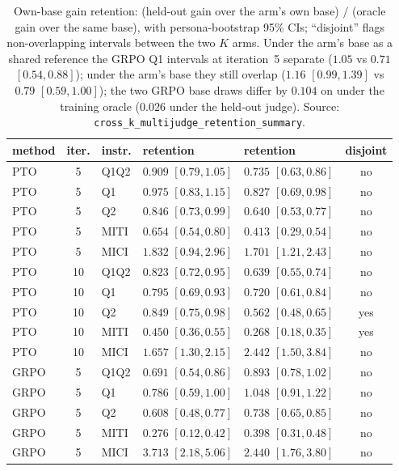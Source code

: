 \begin{table}[t]
  \centering\scriptsize
  \setlength{\tabcolsep}{2pt}
  \begin{tabular}{@{}l c l ll c@{}}
    \toprule
    method & iter. & instr. & \Kz{} retention & \Kf{} retention & disjoint \\
    \midrule
PTO & 5 & Q1Q2 & $0.909$ $[0.79, 1.05]$ & $0.735$ $[0.63, 0.86]$ & no \\
PTO & 5 & Q1 & $0.975$ $[0.83, 1.15]$ & $0.827$ $[0.69, 0.98]$ & no \\
PTO & 5 & Q2 & $0.846$ $[0.73, 0.99]$ & $0.640$ $[0.53, 0.77]$ & no \\
PTO & 5 & MITI & $0.654$ $[0.54, 0.80]$ & $0.413$ $[0.29, 0.54]$ & no \\
PTO & 5 & MICI & $1.832$ $[0.94, 2.96]$ & $1.701$ $[1.21, 2.43]$ & no \\
\addlinespace[2pt]
PTO & 10 & Q1Q2 & $0.823$ $[0.72, 0.95]$ & $0.639$ $[0.55, 0.74]$ & no \\
PTO & 10 & Q1 & $0.795$ $[0.69, 0.93]$ & $0.720$ $[0.61, 0.84]$ & no \\
PTO & 10 & Q2 & $0.849$ $[0.75, 0.98]$ & $0.562$ $[0.48, 0.65]$ & yes \\
PTO & 10 & MITI & $0.450$ $[0.36, 0.55]$ & $0.268$ $[0.18, 0.35]$ & yes \\
PTO & 10 & MICI & $1.657$ $[1.30, 2.15]$ & $2.442$ $[1.50, 3.84]$ & no \\
\addlinespace[2pt]
GRPO & 5 & Q1Q2 & $0.691$ $[0.54, 0.86]$ & $0.893$ $[0.78, 1.02]$ & no \\
GRPO & 5 & Q1 & $0.786$ $[0.59, 1.00]$ & $1.048$ $[0.91, 1.22]$ & no \\
GRPO & 5 & Q2 & $0.608$ $[0.48, 0.77]$ & $0.738$ $[0.65, 0.85]$ & no \\
GRPO & 5 & MITI & $0.276$ $[0.12, 0.42]$ & $0.398$ $[0.31, 0.48]$ & no \\
GRPO & 5 & MICI & $3.713$ $[2.18, 5.06]$ & $2.440$ $[1.76, 3.80]$ & no \\
    \bottomrule
  \end{tabular}
  \caption{Own-base gain retention: (held-out gain over the arm's own base) $/$ (oracle gain over
    the same base), with persona-bootstrap 95\% CIs; ``disjoint'' flags non-overlapping intervals
    between the two $K$ arms. Under the \Kf{} arm's base as a shared reference the GRPO Q1 intervals
    at iteration~5 separate ($1.05$ vs $0.71$ $[0.54, 0.88]$); under the \Kz{} arm's base they
    still overlap ($1.16$ $[0.99, 1.39]$ vs $0.79$ $[0.59, 1.00]$); the two GRPO base draws differ
    by $0.104$ on \QQ{} under the training oracle ($0.026$ under the held-out judge).
    Source: \texttt{cross\_k\_multijudge\_retention\_summary}.}
  \label{tab:app:retention}
\end{table}

